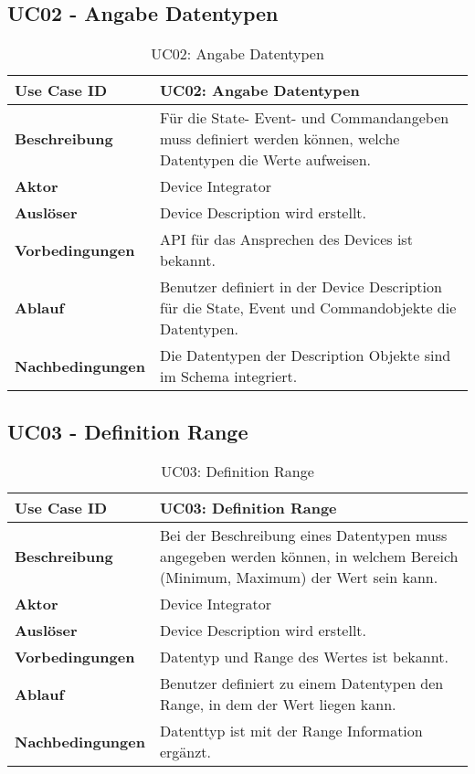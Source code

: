 \subsection{UC02 - Angabe Datentypen}

\begin{table}[H]
\begin{tabularx}{\textwidth}{|l|X|}

 \hline
 {\bf Use Case ID }    & UC02: Angabe Datentypen \\  \hline
 {\bf Beschreibung }   & Für die State- Event- und Commandangeben muss definiert werden können, welche Datentypen die Werte aufweisen. \\ \hline
 {\bf Aktor }          & Device Integrator \\ \hline
 {\bf Auslöser }       & Device Description wird erstellt. \\ \hline
 {\bf Vorbedingungen } & API für das Ansprechen des Devices ist bekannt. \\ \hline
 {\bf Ablauf }         & Benutzer definiert in der Device Description für die State, Event und Commandobjekte die Datentypen. \\ \hline
 {\bf Nachbedingungen} &  Die Datentypen der Description Objekte sind im Schema integriert. \\ \hline
  
\end{tabularx}
\caption{UC02: Angabe Datentypen}
\end{table}

\subsection{UC03 - Definition Range}

\begin{table}[H]
\begin{tabularx}{\textwidth}{|l|X|}

 \hline
 {\bf Use Case ID }    & UC03: Definition Range \\  \hline
 {\bf Beschreibung }   & Bei der Beschreibung eines Datentypen muss angegeben werden können, in welchem Bereich (Minimum, Maximum) der Wert sein kann. \\ \hline
 {\bf Aktor }          & Device Integrator \\ \hline
 {\bf Auslöser }       & Device Description wird erstellt. \\ \hline
 {\bf Vorbedingungen } & Datentyp und Range des Wertes ist bekannt. \\ \hline
 {\bf Ablauf }         & Benutzer definiert zu einem Datentypen den Range, in dem der Wert liegen kann. \\ \hline
 {\bf Nachbedingungen} & Datenttyp ist mit der Range Information ergänzt. \\ \hline
  
\end{tabularx}
\caption{UC03: Definition Range}
\end{table}

